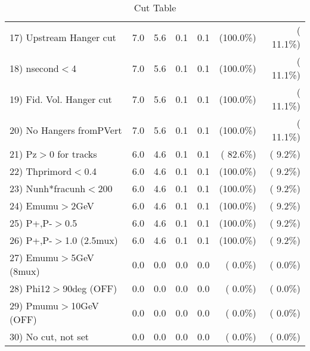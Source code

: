 \begin{table}[h!]
\begin{tabular}{||l||r|r|r|r|r|r||}
 17) Upstream Hanger cut  &          7.0 &          5.6 &          0.1 &          0.1 & (100.0\%) & ( 11.1\%) \\
 18) nsecond$<$4          &          7.0 &          5.6 &          0.1 &          0.1 & (100.0\%) & ( 11.1\%) \\
 19) Fid. Vol. Hanger cut &          7.0 &          5.6 &          0.1 &          0.1 & (100.0\%) & ( 11.1\%) \\
 20) No Hangers fromPVert &          7.0 &          5.6 &          0.1 &          0.1 & (100.0\%) & ( 11.1\%) \\
 21) Pz$>$0 for tracks    &          6.0 &          4.6 &          0.1 &          0.1 & ( 82.6\%) & (  9.2\%) \\
 22) Thprimord$<$0.4      &          6.0 &          4.6 &          0.1 &          0.1 & (100.0\%) & (  9.2\%) \\
 23) Nunh*fracunh$<$200   &          6.0 &          4.6 &          0.1 &          0.1 & (100.0\%) & (  9.2\%) \\
 24) Emumu$>$2GeV         &          6.0 &          4.6 &          0.1 &          0.1 & (100.0\%) & (  9.2\%) \\
 25) P+,P-$>$0.5          &          6.0 &          4.6 &          0.1 &          0.1 & (100.0\%) & (  9.2\%) \\
 26) P+,P-$>$1.0 (2.5mux) &          6.0 &          4.6 &          0.1 &          0.1 & (100.0\%) & (  9.2\%) \\
 27) Emumu$>$5GeV  (8mux) &          0.0 &          0.0 &          0.0 &          0.0 & (  0.0\%) & (  0.0\%) \\
 28) Phi12$>$90deg  (OFF) &          0.0 &          0.0 &          0.0 &          0.0 & (  0.0\%) & (  0.0\%) \\
 29) Pmumu$>$10GeV  (OFF) &          0.0 &          0.0 &          0.0 &          0.0 & (  0.0\%) & (  0.0\%) \\
 30) No cut, not set      &          0.0 &          0.0 &          0.0 &          0.0 & (  0.0\%) & (  0.0\%) \\
 \hline
 \hline
 \end{tabular}
 \caption{Cut Table           }
 \label{tab-cutheavy_neutrino_1.000}
 \end{table}
